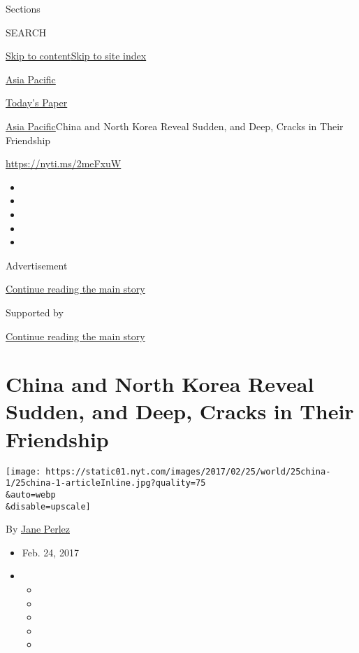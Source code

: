 Sections

SEARCH

\protect\hyperlink{site-content}{Skip to
content}\protect\hyperlink{site-index}{Skip to site index}

\href{https://www.nytimes.com/section/world/asia}{Asia Pacific}

\href{https://myaccount.nytimes.com/auth/login?response_type=cookie\&client_id=vi}{}

\href{https://www.nytimes.com/section/todayspaper}{Today's Paper}

\href{/section/world/asia}{Asia Pacific}\textbar{}China and North Korea
Reveal Sudden, and Deep, Cracks in Their Friendship

\url{https://nyti.ms/2meFxuW}

\begin{itemize}
\item
\item
\item
\item
\item
\end{itemize}

Advertisement

\protect\hyperlink{after-top}{Continue reading the main story}

Supported by

\protect\hyperlink{after-sponsor}{Continue reading the main story}

\hypertarget{china-and-north-korea-reveal-sudden-and-deep-cracks-in-their-friendship}{%
\section{China and North Korea Reveal Sudden, and Deep, Cracks in Their
Friendship}\label{china-and-north-korea-reveal-sudden-and-deep-cracks-in-their-friendship}}

\texttt{[image: https://static01.nyt.com/images/2017/02/25/world/25china-1/25china-1-articleInline.jpg?quality=75\\\&auto=webp\\\&disable=upscale]}

By \href{http://www.nytimes.com/by/jane-perlez}{Jane Perlez}

\begin{itemize}
\item
  Feb. 24, 2017
\item
  \begin{itemize}
  \item
  \item
  \item
  \item
  \item
  \end{itemize}
\end{itemize}


